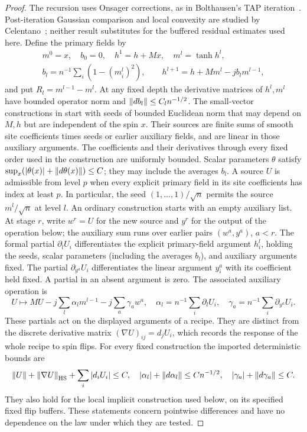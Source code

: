 \begin{proof}
The recursion uses Onsager corrections, as in Bolthausen's TAP
iteration~\cite{Bolthausen2014}. Post-iteration Gaussian comparison
and local convexity are studied by Celentano~\cite{Celentano2024}; neither
result substitutes for the buffered residual estimates used here.
Define the primary fields by
\[
 \begin{gathered}
 m^0=x,\quad b_0=0,\quad h^1=h+Mx,\quad
 m^l=\tanh h^l,\\
 b_l=n^{-1}\sum_i(1-(m_i^l)^2),\qquad
 h^{l+1}=h+Mm^l-jb_lm^{l-1},
 \end{gathered}
\]
and put $R_l=m^{l-1}-m^l$.  At any fixed depth the derivative matrices of
$h^l,m^l$ have bounded operator norm and
$\left\lVert db_l\right\rVert\le C_l n^{-1/2}$.  The small-vector constructions in \cite[Definition~6.2]{SKGap} start with
seeds of bounded Euclidean norm that may depend on $M,h$ but are
independent of the spin $x$.
Their sources are finite sums of smooth site coefficients times seeds
or earlier auxiliary fields, and are linear in those auxiliary arguments.
The coefficients and their derivatives
through every fixed order used in the construction are uniformly bounded.
Scalar parameters $\theta$ satisfy
$\sup_x(|\theta(x)|+\left\lVert d\theta(x)\right\rVert)\le C$; they may include the averages
$b_l$. A source $U$ is admissible from level $p$ when every explicit
primary field in its site coefficients has index at least $p$.
In particular, the seed $(1,\ldots,1)/\sqrt n$ permits the source
$m^l/\sqrt n$ at level $l$.
An ordinary construction starts with an empty auxiliary list.
At stage $r$, write $w^r=U$ for the new source and $y^r$ for the
output of the operation below; the auxiliary sum runs over earlier
pairs $(w^a,y^a)$, $a<r$.  The formal partial $\partial_lU_i$
differentiates the explicit primary-field argument $h_i^l$, holding
the seeds, scalar parameters (including the averages $b_l$), and
auxiliary arguments fixed.  The partial $\partial_{y^a}U_i$
differentiates the linear argument $y_i^a$ with its coefficient
held fixed.  A partial in an absent argument is zero.
The associated auxiliary operation is
\begin{equation}\label{eq:stat-auxiliary}
 U\longmapsto MU-j\sum_l\alpha_lm^{l-1}-j\sum_a\gamma_a w^a,
 \quad
 \alpha_l=n^{-1}\sum_i\partial_lU_i,\quad
 \gamma_a=n^{-1}\sum_i\partial_{y^a}U_i.
\end{equation}
These partials act on the displayed arguments of a recipe.  They are
distinct from the discrete derivative matrix $(\nabla U)_{ij}=d_jU_i$,
which records the response of the whole recipe to spin flips.
For every fixed construction the imported deterministic bounds are
\begin{equation}\label{eq:stat-small-bounds}
 \left\lVert U\right\rVert+\left\lVert \nabla U\right\rVert_{\mathrm{HS}}+\sum_i|d_iU_i|\le C,
 \quad
 |\alpha_l|+\left\lVert d\alpha_l\right\rVert\le Cn^{-1/2},
 \quad |\gamma_a|+\left\lVert d\gamma_a\right\rVert\le C.
\end{equation}
They also hold for the local implicit construction used below, on its
specified fixed flip buffers.  These statements concern pointwise
differences and have no dependence on the law under which they are tested.


\end{proof}
